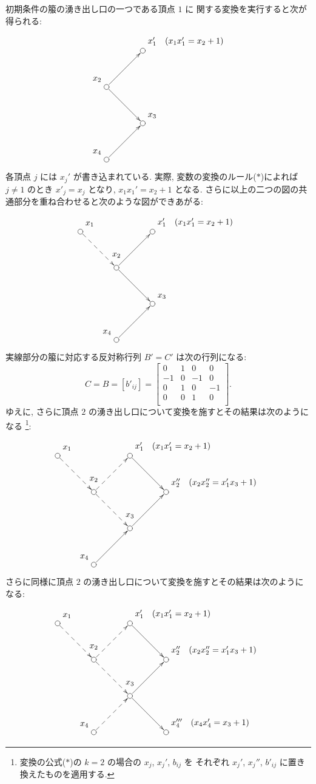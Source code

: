 \documentclass[12pt,twoside,dvipdfm]{jarticle}
\theoremstyle{definition} %
\theoremstyle{definition} %
\theoremstyle{definition} %
\numberwithin{theorem}{section}
\numberwithin{equation}{section}
\numberwithin{figure}{section}
\numberwithin{table}{section}
\begin{document}
初期条件の箙の湧き出し口の一つである頂点 $1$ に
関する変換を実行すると次が得られる:
\[
\begin{xy}
 (15,30) *+[Fo]{}="2"*++!DR{x_2},
 (30,15) *+[Fo]{}="3"*++!DL{x_3},
 (15, 0) *+[Fo]{}="4"*++!DR{x_4},
 (30,45) *+[Fo]{}="1'"*++!DL{x_1' \quad(x_1x_1'=x_2+1)},
 \ar@{->}"2";"3",
 \ar@{->}"4";"3",
 \ar@{->}"2";"1'"
\end{xy}
\]
各頂点 $j$ には $x_j'$ が書き込まれている.
実際, 変数の変換のルール($*$)によれば $j\ne 1$ のとき $x'_j=x_j$ 
となり, $x_1x_1'=x_2+1$ となる. 
さらに以上の二つの図の共通部分を重ね合わせると次のような図ができあがる:
\[
\begin{xy}
 ( 0,45) *+[Fo]{}="1"*++!DL{x_1},
 (15,30) *+[Fo]{}="2"*++++!D{x_2},
 (30,15) *+[Fo]{}="3"*++!DL{x_3},
 (15, 0) *+[Fo]{}="4"*++!DR{x_4},
 (30,45) *+[Fo]{}="1'"*++!DL{x_1' \quad(x_1x_1'=x_2+1)},
 \ar@{->}"2";"1'",
 \ar@{->}"2";"3",
 \ar@{->}"4";"3",
 \ar@{-->}"1";"2"
\end{xy}
\]
実線部分の箙に対応する反対称行列 $B'=C'$ は次の行列になる:
\begin{equation*}
C = B = [b'_{ij}] =
\begin{bmatrix}
  0 & 1 & 0 & 0 \\
 -1 & 0 &-1 & 0 \\
  0 & 1 & 0 &-1 \\
  0 & 0 & 1 & 0 \\
\end{bmatrix}.
\end{equation*}
ゆえに, さらに頂点 $2$ の湧き出し口について変換を施すとその結果は次のようになる%
\footnote{変換の公式($*$)の $k=2$ の場合の $x_j$, $x_j'$, $b_{ij}$ を
それぞれ $x_j'$, $x_j''$, $b'_{ij}$ に置き換えたものを適用する.}:
\[
\begin{xy}
 ( 0,45) *+[Fo]{}="1"*++!DL{x_1},
 (15,30) *+[Fo]{}="2"*++++!D{x_2},
 (30,15) *+[Fo]{}="3"*++++!D{x_3},
 (15, 0) *+[Fo]{}="4"*++!DR{x_4},
 (30,45) *+[Fo]{}="1'"*++!DL{x_1' \quad(x_1x_1'=x_2+1)},
 (45,30) *+[Fo]{}="2''"*++!DL{x_2'' \quad(x_2x_2''=x_1'x_3+1)},
 \ar@{-->}"1";"2",
 \ar@{-->}"2";"3",
 \ar@{->}"4";"3",
 \ar@{-->}"2";"1'",
 \ar@{->}"1'";"2''",
 \ar@{->}"3";"2''"
\end{xy}
\]
さらに同様に頂点 $2$ の湧き出し口について変換を施すとその結果は次のようになる:
\[
\begin{xy}
 ( 0,45) *+[Fo]{}="1"*++!DL{x_1},
 (15,30) *+[Fo]{}="2"*++++!D{x_2},
 (30,15) *+[Fo]{}="3"*++++!D{x_3},
 (15, 0) *+[Fo]{}="4"*++!DR{x_4},
 (30,45) *+[Fo]{}="1'"*++!DL{x_1' \quad(x_1x_1'=x_2+1)},
 (45,30) *+[Fo]{}="2''"*++!DL{x_2'' \quad(x_2x_2''=x_1'x_3+1)},
 (45, 0) *+[Fo]{}="4'''"*++!DL{x_4''' \quad(x_4x_4'=x_3+1)},
 \ar@{-->}"1";"2",
 \ar@{-->}"2";"3",
 \ar@{-->}"4";"3",
 \ar@{-->}"2";"1'",
 \ar@{->}"1'";"2''",
 \ar@{->}"3";"2''",
 \ar@{->}"3";"4'''"
\end{xy}
\]
\end{document}

